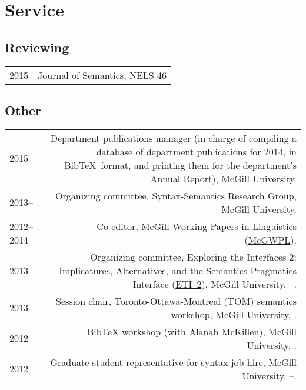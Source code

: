 \documentclass{article}
\makeatletter
\newcommand{\formatdatenoday}[2]{\mydatenoday\formatdate{0}{#1}{#2}}
\newcommand{\myvrule}{\color{lightgray}\vrule width 1.0pt}
\newenvironment{cvsection}{%
  \renewcommand{\arraystretch}{1.75}
  \begin{longtable}[l]{@{} L R @{}}
}{%
  \end{longtable}
}
\makeatother
\begin{document}
\section*{Service}

\subsection*{Reviewing}

\begin{cvsection}
  2015 & Journal of Semantics, NELS 46
\end{cvsection}

\subsection*{Other}

\begin{cvsection}
  2015 & Department publications manager (in charge of compiling a database of
  department publications for 2014, in Bib\TeX\ format, and printing them for
  the department's Annual Report), McGill University. \\

  2013-- & Organizing committee, Syntax-Semantics Research Group, McGill
  University. \\

  2012--2014 & Co-editor, McGill Working Papers in Linguistics
  (\href{http://www.mcgill.ca/mcgwpl/}{McGWPL}). \\

  2013 & Organizing committee, Exploring the Interfaces 2: Implicatures,
  Alternatives, and the Semantics-Pragmatics Interface
  (\href{https://sites.google.com/site/eti2pragmatics/}{ETI~2}), McGill
  University, \shortmonthname[4]--\formatdatenoday{6}{2013}. \\

  2013 & Session chair, Toronto-Ottawa-Montreal (TOM) semantics workshop,
  McGill University, . \\


  2012 & Bib\TeX{} workshop (with
  \href{http://people.linguistics.mcgill.ca/~alanah.mckillen/}{Alanah
  McKillen}), McGill University, . \\

  2012 & Graduate student representative for syntax job hire, McGill
  University, \shortmonthname[5]--\formatdatenoday{6}{2012}. \\


\end{cvsection}
\end{document}

